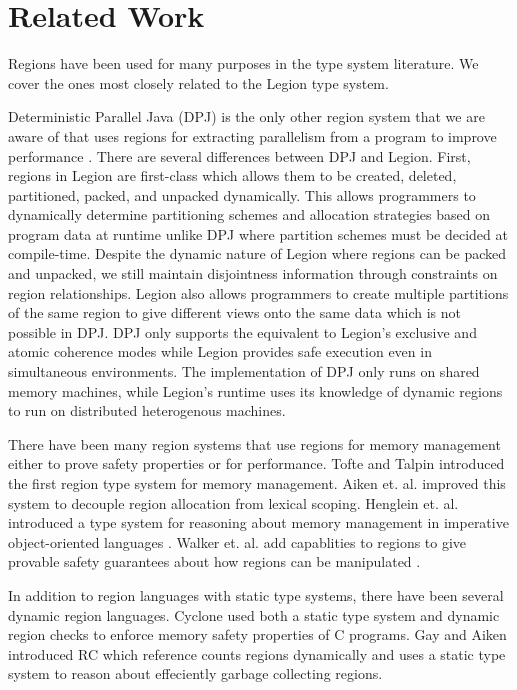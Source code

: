 
\section{Related Work}
\label{sec:related}
Regions have been used for many purposes in the type system literature.  We
cover the ones most closely related to the Legion type system.

Deterministic Parallel Java (DPJ) is the only other region system that we are
aware of that uses regions for extracting parallelism from a 
program to improve performance \cite{Bocchino09}.  There are several
differences between DPJ and Legion.  First, regions in Legion are first-class 
which allows them to be created, deleted, partitioned, packed, and unpacked 
dynamically.  This allows programmers to dynamically determine partitioning
schemes and allocation strategies based on program data at runtime unlike DPJ
where partition schemes must be decided at compile-time.  Despite the dynamic nature
of Legion where regions can be packed and unpacked, we still maintain disjointness
information through constraints on region relationships.  Legion also allows 
programmers to create multiple partitions of the same region to give different 
views onto the same data which is not possible in DPJ.  DPJ only supports the 
equivalent to Legion's exclusive and atomic coherence modes \cite{Bocchino11} 
while Legion provides safe execution even in simultaneous environments.  The 
implementation of DPJ only runs on shared memory machines, while Legion's runtime
uses its knowledge of dynamic regions to run on distributed heterogenous machines.

There have been many region systems that use regions for memory management either
to prove safety properties or for performance.  Tofte and Talpin introduced the
first region type system for memory management\cite{Tofte94}.  Aiken et. al. 
improved this system to decouple region allocation from lexical scoping\cite{Aiken95}.
Henglein et. al. introduced a type system for reasoning about memory management
in imperative object-oriented languages \cite{Henglein01}.  Walker et. al. add
capablities to regions to give provable safety guarantees about how regions
can be manipulated \cite{Walker00}.  

In addition to region languages with static type systems, there have been several
dynamic region languages.  Cyclone used both a static type system and dynamic
region checks to enforce memory safety properties of C programs\cite{Grossman02}.
Gay and Aiken introduced RC which reference counts regions dynamically and uses
a static type system to reason about effeciently garbage collecting regions\cite{Gay01}.


